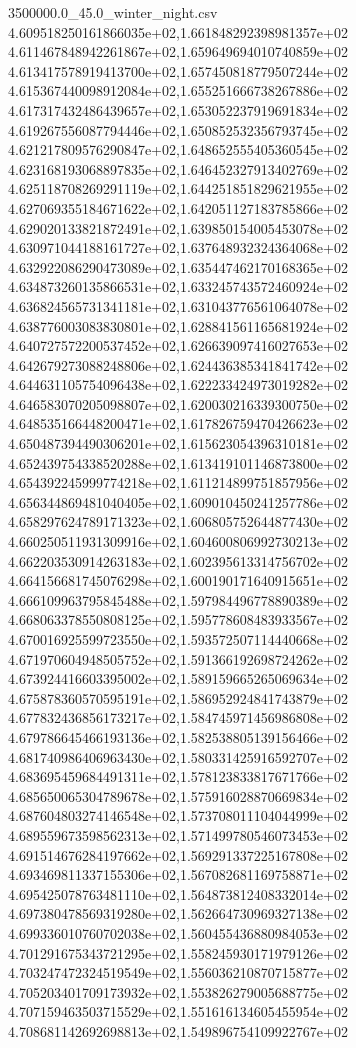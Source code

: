 \begin{filecontents*}{3500000.0_45.0_winter_night.csv}
4.609518250161866035e+02,1.661848292398981357e+02
4.611467848942261867e+02,1.659649694010740859e+02
4.613417578919413700e+02,1.657450818779507244e+02
4.615367440098912084e+02,1.655251666738267886e+02
4.617317432486439657e+02,1.653052237919691834e+02
4.619267556087794446e+02,1.650852532356793745e+02
4.621217809576290847e+02,1.648652555405360545e+02
4.623168193068897835e+02,1.646452327913402769e+02
4.625118708269291119e+02,1.644251851829621955e+02
4.627069355184671622e+02,1.642051127183785866e+02
4.629020133821872491e+02,1.639850154005453078e+02
4.630971044188161727e+02,1.637648932324364068e+02
4.632922086290473089e+02,1.635447462170168365e+02
4.634873260135866531e+02,1.633245743572460924e+02
4.636824565731341181e+02,1.631043776561064078e+02
4.638776003083830801e+02,1.628841561165681924e+02
4.640727572200537452e+02,1.626639097416027653e+02
4.642679273088248806e+02,1.624436385341841742e+02
4.644631105754096438e+02,1.622233424973019282e+02
4.646583070205098807e+02,1.620030216339300750e+02
4.648535166448200471e+02,1.617826759470426623e+02
4.650487394490306201e+02,1.615623054396310181e+02
4.652439754338520288e+02,1.613419101146873800e+02
4.654392245999774218e+02,1.611214899751857956e+02
4.656344869481040405e+02,1.609010450241257786e+02
4.658297624789171323e+02,1.606805752644877430e+02
4.660250511931309916e+02,1.604600806992730213e+02
4.662203530914263183e+02,1.602395613314756702e+02
4.664156681745076298e+02,1.600190171640915651e+02
4.666109963795845488e+02,1.597984496778890389e+02
4.668063378550808125e+02,1.595778608483933567e+02
4.670016925599723550e+02,1.593572507114440668e+02
4.671970604948505752e+02,1.591366192698724262e+02
4.673924416603395002e+02,1.589159665265069634e+02
4.675878360570595191e+02,1.586952924841743879e+02
4.677832436856173217e+02,1.584745971456986808e+02
4.679786645466193136e+02,1.582538805139156466e+02
4.681740986406963430e+02,1.580331425916592707e+02
4.683695459684491311e+02,1.578123833817671766e+02
4.685650065304789678e+02,1.575916028870669834e+02
4.687604803274146548e+02,1.573708011104044999e+02
4.689559673598562313e+02,1.571499780546073453e+02
4.691514676284197662e+02,1.569291337225167808e+02
4.693469811337155306e+02,1.567082681169758871e+02
4.695425078763481110e+02,1.564873812408332014e+02
4.697380478569319280e+02,1.562664730969327138e+02
4.699336010760702038e+02,1.560455436880984053e+02
4.701291675343721295e+02,1.558245930171979126e+02
4.703247472324519549e+02,1.556036210870715877e+02
4.705203401709173932e+02,1.553826279005688775e+02
4.707159463503715529e+02,1.551616134605455954e+02
4.708681142692698813e+02,1.549896754109922767e+02

\end{filecontents*}
